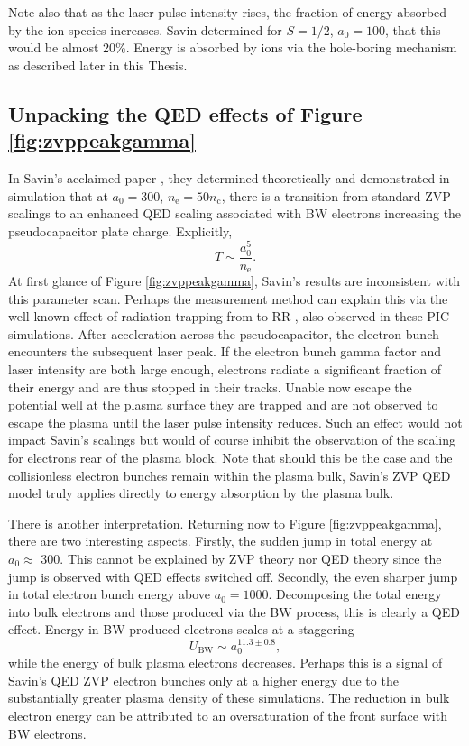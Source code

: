 Note also that as the laser pulse intensity rises, the fraction of energy absorbed by the ion species increases. Savin \cite{savinModellingLaserPlasmaInteractions2019} determined for $S=1/2$, $a_0 = 100$, that this would be almost 20\%. Energy is absorbed by ions via the hole-boring mechanism as described later in this Thesis.

\subsection{Unpacking the QED effects of Figure \ref{fig:zvppeakgamma}}
In Savin's acclaimed paper \cite{savinEnergyAbsorptionLaserQED2019}, they determined theoretically and demonstrated in simulation that at $a_0 = 300$, $n_\mathrm{e} = 50 n_\mathrm{c}$, there is a transition from standard ZVP scalings to an enhanced QED scaling associated with \ac{BW} electrons increasing the pseudocapacitor plate charge. Explicitly,
\begin{equation}
	T \sim \frac{a^5_0}{\bar{n}_\mathrm{e}}.
\end{equation}
At first glance of Figure \ref{fig:zvppeakgamma}, Savin's results are inconsistent with this parameter scan. Perhaps the measurement method can explain this via the well-known effect of radiation trapping from to \ac{RR} \cite{jiRadiationReactionTrappingElectrons2014}, also observed in these PIC simulations. After acceleration across the pseudocapacitor, the electron bunch encounters the subsequent laser peak. If the electron bunch gamma factor and laser intensity are both large enough, electrons radiate a significant fraction of their energy and are thus stopped in their tracks. Unable now escape the potential well at the plasma surface they are trapped and are not observed to escape the plasma until the laser pulse intensity reduces. Such an effect would not impact Savin's scalings but would of course inhibit the observation of the scaling for electrons rear of the plasma block. Note that should this be the case and the collisionless electron bunches remain within the plasma bulk, Savin's ZVP QED model truly applies directly to energy absorption by the plasma bulk.

There is another interpretation. Returning now to Figure \ref{fig:zvppeakgamma}, there are two interesting aspects. Firstly, the sudden jump in total energy at $a_0 \approx$ 300. This cannot be explained by ZVP theory nor QED theory since the jump is observed with QED effects switched off. Secondly, the even sharper jump in total electron bunch energy above $a_0 = 1000$. Decomposing the total energy into bulk electrons and those produced via the BW process, this is clearly a QED effect. Energy in BW produced electrons scales at a staggering
\begin{equation}
	U_\mathrm{BW} \sim a^{11.3\pm 0.8}_0,
\end{equation}
while the energy of bulk plasma electrons decreases. Perhaps this is a signal of Savin's QED ZVP electron bunches only at a higher energy due to the substantially greater plasma density of these simulations. The reduction in bulk electron energy can be attributed to an oversaturation of the front surface with BW electrons.

